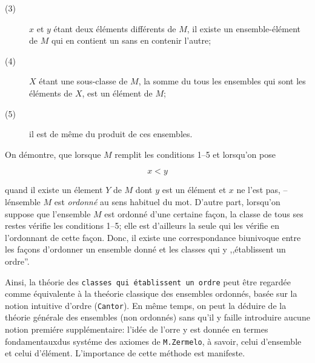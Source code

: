 \documentclass[12pt,french]{article}
\begin{document}
\begin{description}
  \item[(3)] $x$ et $y$ \'etant deux \'el\'ements diff\'erents de $M$, il existe un ensemble-\'el\'ement de $M$ qui en contient un sans en contenir l'autre;
  \item[(4)] $X$ \'etant une sous-classe de $M$, la somme du tous les ensembles qui sont les \'el\'ements de $X$, est un \'el\'ement de $M$;
  \item[(5)] il est de m\^eme du produit de ces ensembles.
\end{description}

On d\'emontre, que lorsque $M$ remplit les conditions 1--5 et lorsqu'on pose

\[ x < y \]

quand il existe un \'element $Y$ de $M$ dont $y$ est un \'el\'ement et $x$ ne l'est pas, -- l\'ensemble $M$ est \textit{ordonn\'e} au sens habituel du mot. D'autre part, lorsqu'on suppose que l'ensemble $M$ est ordonn\'e d'une certaine fa\c con, la classe de tous ses restes\footnotemark{}  v\'erifie les conditions 1--5; elle est d'ailleurs la seule\footnotemark{} qui les v\'erifie en l'ordonnant de cette fa\c con. Donc, il existe une correspondance biunivoque entre les fa\c cons d'ordonner un ensemble donn\'e et les classes qui y ,,\'etablissent un ordre''.

Ainsi, la th\'eorie des \texttt{classes qui \'etablissent un ordre} peut \^etre regard\'ee comme \'equivalente \`a la the\'eorie classique des ensembles ordonn\'es, bas\'ee sur la notion intuitive d'ordre (\texttt{Cantor}). En m\^eme temps, on peut la d\'eduire de la th\'eorie g\'en\'erale des ensembles (non ordonn\'es) sans qu'il y faille introduire aucune notion premi\'ere suppl\'ementaire: l'id\'ee de l'orre y est donn\'ee en termes fondamentauxdus syst\'eme des axiomes de \texttt{M.Zermelo}\footnotemark{}, \`a savoir, celui d'ensemble et celui d'\'el\'ement\footnotemark{}. L'importance de cette m\'ethode est manifeste.





\end{document}
